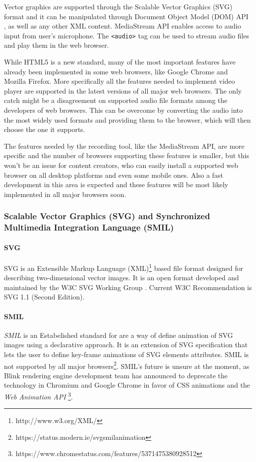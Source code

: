Vector graphics are supported through the Scalable Vector Graphics (SVG) format \cite{svg} and it can be manipulated through Document Object Model (DOM) API \cite{dom}, as well as any other XML content. MediaStream API \cite{} enables access to audio input from user's microphone. The \verb|<audio>| tag can be used to stream audio files and play them in the web browser.

While HTML5 is a new standard, many of the most important features have already been implemented in some web browsers, like Google Chrome and Mozilla Firefox. More specifically all the features needed to implement video player are supported in the latest versions of all major web browsers. The only catch might be a disagreement on supported audio file formats among the developers of web browsers. This can be overcome by converting the audio into the most widely used formats and providing them to the browser, which will then choose the one it supports.

The features needed by the recording tool, like the MediaStream API, are more specific and the number of browsers supporting these features is smaller, but this won't be an issue for content creators, who can easily install a supported web browser on all desktop platforms and even some mobile ones. Also a fast development in this area is expected and these features will be most likely implemented in all major browsers soon.

\subsubsection*{Scalable Vector Graphics (SVG) and Synchronized Multimedia Integration Language (SMIL)}
\paragraph{SVG} SVG is an Extensible Markup Language (XML)\footnote{http://www.w3.org/XML/} based file format designed for describing two-dimensional vector images\cite{svg}. It is an open format developed and maintained by the W3C SVG Working Group \cite{}. Current W3C Recommendation is SVG 1.1 (Second Edition).

\paragraph{SMIL} \textit{SMIL} is an Estabelished standard for  are a way of define animation of SVG images using a declarative approach. It is an extension of SVG specification that lets the user to define key-frame animations of SVG elements attributes. SMIL is not supported by all major browsers\footnote{https://status.modern.ie/svgsmilanimation}. SMIL's future is unsure at the moment, as Blink rendering engine development team has announced to deprecate the technology in Chromium and Google Chrome in favor of CSS animations and the \textit{Web Animation API} \cite{} \footnote{https://www.chromestatus.com/features/5371475380928512}. 

